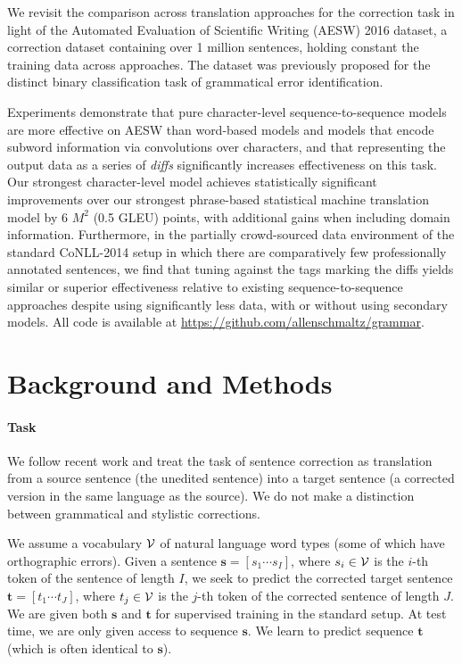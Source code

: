 \documentclass[11pt,letterpaper]{article}
\begin{document}
We revisit the comparison across translation approaches for the correction task in light of the Automated Evaluation of Scientific Writing (AESW) 2016 dataset, a correction dataset containing over 1 million sentences, holding constant the training data across approaches. The dataset was previously proposed for the distinct binary classification task of grammatical error identification. 

Experiments demonstrate that pure character-level sequence-to-sequence models are more effective on AESW than word-based models and models that encode subword information via convolutions over characters, and that representing the output data as a series of \emph{diffs} significantly increases effectiveness on this task. Our strongest character-level model achieves statistically significant improvements over our strongest phrase-based statistical machine translation model by 6 $M^2$ (0.5 GLEU) points, with additional gains when including domain information. Furthermore, in the partially crowd-sourced data environment of the standard CoNLL-2014 setup in which there are comparatively few professionally annotated sentences, we find that tuning against the tags marking the diffs yields similar or superior effectiveness relative to existing sequence-to-sequence approaches despite using significantly less data, with or without using secondary models. All code is available at \url{https://github.com/allenschmaltz/grammar}.

\section{Background and Methods}
\paragraph{Task} 
We follow recent work and treat the task of sentence correction as translation from a source sentence (the unedited sentence) into a target sentence (a corrected version in the same language as the source). We do not make a distinction between grammatical and stylistic corrections.

We assume a vocabulary $\mathcal{V}$ of natural language word types (some of which have orthographic errors).
Given a sentence $\mathbf{s} = [s_1 \cdots s_I]$, where $s_i \in \mathcal{V}$ is the $i$-th token of the sentence of length $I$, we seek to predict the corrected target sentence $\mathbf{t} = [t_1 \cdots t_J]$, where $t_j \in \mathcal{V}$ is the $j$-th token of the corrected sentence of length $J$.
We are given both $\mathbf{s}$ and $\mathbf{t}$ for supervised training in the standard setup. At test time, we are only given access to sequence $\mathbf{s}$. We learn to predict sequence $\mathbf{t}$ (which is often identical to $\mathbf{s}$).
\end{document}
